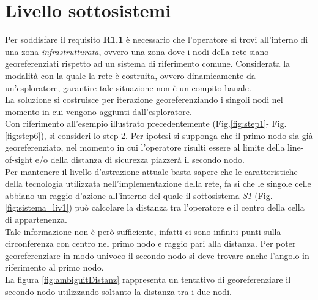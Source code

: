 \section{Livello sottosistemi}
\label{livello_sottosistemi}
Per soddisfare il requisito \textbf{R1.1} è necessario che l'operatore si trovi all'interno di una zona \textit{infrastrutturata}, ovvero una zona dove i nodi della rete siano georeferenziati rispetto ad un sistema di riferimento comune. Considerata la modalità con la quale la rete è costruita, ovvero dinamicamente da un'esploratore,  garantire tale situazione non è un compito banale.\\
La soluzione si costruisce per iterazione georeferenziando i singoli nodi nel momento in cui vengono aggiunti dall'esploratore.\\
Con riferimento all'esempio illustrato precedentemente (Fig.\ref{fig:step1}- Fig.\ref{fig:step6}), si consideri lo step 2.
Per ipotesi si supponga che il primo nodo sia già georeferenziato, nel momento in cui l'operatore risulti essere al limite della line-of-sight e/o della distanza di sicurezza piazzerà il secondo nodo. \\
Per mantenere il livello d'astrazione attuale basta sapere che le caratteristiche della tecnologia utilizzata nell'implementazione della rete, fa si che le singole celle abbiano un raggio d'azione all'interno del quale il sottosistema \textit{S1} (Fig.\ref{fig:sistema_liv1}) può calcolare la distanza tra l'operatore e il centro della cella di appartenenza.\\
Tale informazione non è però sufficiente, infatti ci sono infiniti punti sulla circonferenza con centro nel primo nodo e raggio pari alla distanza. Per poter georeferenziare in modo univoco il secondo nodo si deve trovare anche l'angolo in riferimento al primo nodo.\\
La figura \ref{fig:ambiguitDistanz} rappresenta un tentativo di georeferenziare il secondo nodo utilizzando soltanto la distanza tra i due nodi.

